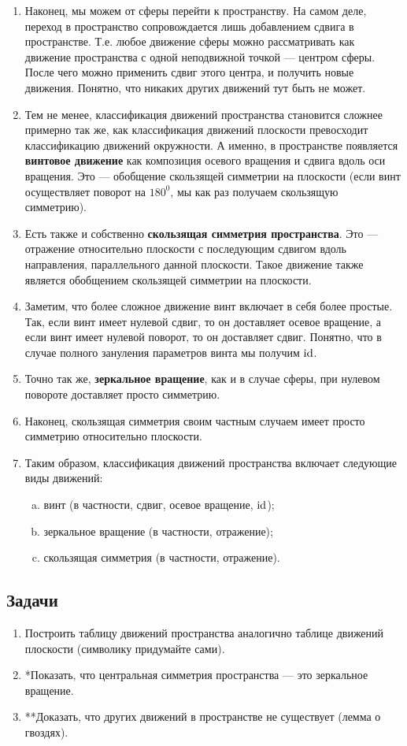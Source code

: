\begin{enumerate}
\item Наконец, мы можем от сферы перейти к пространству. На самом деле, переход в пространство сопровождается лишь добавлением сдвига в пространстве. Т.е. любое движение сферы можно рассматривать как движение пространства с одной неподвижной точкой --- центром сферы. После чего можно применить сдвиг этого центра, и получить новые движения. Понятно, что никаких других движений тут быть не может.
\item Тем не менее, классификация движений пространства становится сложнее примерно так же, как классификация движений плоскости превосходит классификацию движений окружности. А именно, в пространстве появляется \textbf{винтовое движение} как композиция осевого вращения и сдвига вдоль оси вращения. Это --- обобщение скользящей симметрии на плоскости (если винт осуществляет поворот на $180^0$, мы как раз получаем скользящую симметрию).
\item Есть также и собственно \textbf{скользящая симметрия пространства}. Это --- отражение относительно плоскости с последующим сдвигом вдоль направления, параллельного данной плоскости. Такое движение также является обобщением скользящей симметрии на плоскости.
\item Заметим, что более сложное движение винт включает в себя более простые. Так, если винт имеет нулевой сдвиг, то он доставляет осевое вращение, а если винт имеет нулевой поворот, то он доставляет сдвиг. Понятно, что в случае полного зануления параметров винта мы получим $\mathrm{id}$.
\item Точно так же, \textbf{зеркальное вращение}, как и в случае сферы, при нулевом повороте доставляет просто симметрию.
\item Наконец, скользящая симметрия своим частным случаем имеет просто симметрию относительно плоскости.
\item Таким образом, классификация движений пространства включает следующие виды движений:
\begin{enumerate}[a)]
\item винт (в частности, сдвиг, осевое вращение, $\mathrm{id}$);
\item зеркальное вращение (в частности, отражение);
\item скользящая симметрия (в частности, отражение).
\end{enumerate}
\end{enumerate}

\subsection{Задачи}
\begin{enumerate}
\item Построить таблицу движений пространства аналогично таблице движений плоскости (символику придумайте сами).
\item *Показать, что центральная симметрия пространства --- это зеркальное вращение.
\item **Доказать, что других движений в пространстве не существует (лемма о гвоздях).
\end{enumerate}


